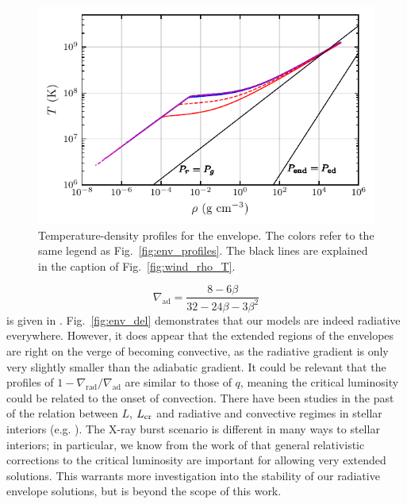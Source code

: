 \documentclass[../main.tex]{subfiles}
\begin{document}
\begin{figure}[H]
    \centering
    \includegraphics{figures/env_rho_T.pdf}
    \caption[Envelope temperature-density profiles]{Temperature-density profiles for the envelope. The colors refer to the same legend as Fig.~\ref{fig:env_profiles}. The black lines are explained in the caption of Fig.~\ref{fig:wind_rho_T}.}
    \label{fig:env_rho_T}
\end{figure}

\begin{equation}\label{eq:del_ad}
    \nabla_\text{ad}=\frac{8-6\beta}{32-24\beta-3\beta^2}
\end{equation}
is given in \citet{HansenKawaler1994}. Fig.~\ref{fig:env_del} demonstrates that our models are indeed radiative everywhere. However, it does appear that the extended regions of the envelopes are right on the verge of becoming convective, as the radiative gradient is only very slightly smaller than the adiabatic gradient. It could be relevant that the profiles of $1-\nabla_\text{rad}/\nabla_\text{ad}$ are similar to those of $q$, meaning the critical luminosity could be related to the onset of convection. There have been studies in the past of the relation between $L$, $L_\text{cr}$ and radiative and convective regimes in stellar interiors (e.g. \citet{Joss1973}). The X-ray burst scenario is different in many ways to stellar interiors; in particular, we know from the work of \citet{Paczynski1986a} that general relativistic corrections to the critical luminosity are important for allowing very extended solutions. This warrants more investigation into the stability of our radiative envelope solutions, but is beyond the scope of this work. 
\end{document}
